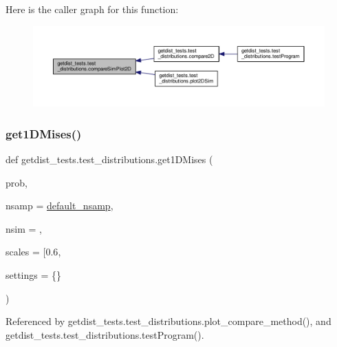 Here is the caller graph for this function\+:
\nopagebreak
\begin{figure}[H]
\begin{center}
\leavevmode
\includegraphics[width=350pt]{namespacegetdist__tests_1_1test__distributions_ae808a89af18399d4abd592da4c182444_icgraph}
\end{center}
\end{figure}
\mbox{\label{namespacegetdist__tests_1_1test__distributions_a023a4d63a4ed9241e54b23f96f3dd9c2}} 
\subsubsection{\texorpdfstring{get1\+D\+Mises()}{get1DMises()}}
{\footnotesize\ttfamily def getdist\+\_\+tests.\+test\+\_\+distributions.\+get1\+D\+Mises (\begin{DoxyParamCaption}\item[{}]{prob,  }\item[{}]{nsamp = {\ttfamily \mbox{\hyperlink{namespacegetdist__tests_1_1test__distributions_af66b4064706bf88e0ed5378ff868fc39}{default\+\_\+nsamp}}},  }\item[{}]{nsim = {},  }\item[{}]{scales = {\ttfamily \mbox{[}0.6},  }\item[{}]{settings = {\ttfamily \{\}} }\end{DoxyParamCaption})}



Referenced by getdist\+\_\+tests.\+test\+\_\+distributions.\+plot\+\_\+compare\+\_\+method(), and getdist\+\_\+tests.\+test\+\_\+distributions.\+test\+Program().

